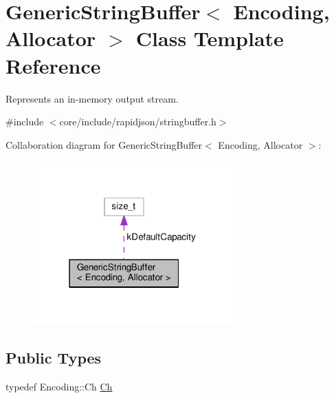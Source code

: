 \hypertarget{classGenericStringBuffer}{}\section{Generic\+String\+Buffer$<$ Encoding, Allocator $>$ Class Template Reference}
\label{classGenericStringBuffer}


Represents an in-\/memory output stream.  




{\ttfamily \#include $<$core/include/rapidjson/stringbuffer.\+h$>$}



Collaboration diagram for Generic\+String\+Buffer$<$ Encoding, Allocator $>$\+:
\nopagebreak
\begin{figure}[H]
\begin{center}
\leavevmode
\includegraphics[width=219pt]{classGenericStringBuffer__coll__graph}
\end{center}
\end{figure}
\subsection*{Public Types}
\begin{DoxyCompactItemize}
\item 
typedef Encoding\+::\+Ch \hyperlink{classGenericStringBuffer_a735b75db076ffe86d0d294be49655d46}{Ch}
\end{DoxyCompactItemize}
